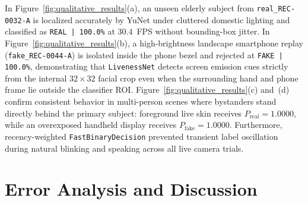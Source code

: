 In Figure~\ref{fig:qualitative_results}(a), an unseen elderly subject from \texttt{real\_REC-0032-A} is localized accurately by YuNet under cluttered domestic lighting and classified as \texttt{REAL | 100.0\%} at $30.4$~FPS without bounding-box jitter. In Figure~\ref{fig:qualitative_results}(b), a high-brightness landscape smartphone replay (\texttt{fake\_REC-0044-A}) is isolated inside the phone bezel and rejected at \texttt{FAKE | 100.0\%}, demonstrating that \texttt{LivenessNet} detects screen emission cues strictly from the internal $32\times32$ facial crop even when the surrounding hand and phone frame lie outside the classifier ROI. Figure~\ref{fig:qualitative_results}(c) and~(d) confirm consistent behavior in multi-person scenes where bystanders stand directly behind the primary subject: foreground live skin receives $P_{\text{real}} = 1.0000$, while an overexposed handheld display receives $P_{\text{fake}} = 1.0000$. Furthermore, recency-weighted \texttt{FastBinaryDecision} prevented transient label oscillation during natural blinking and speaking across all live camera trials.

\section{Error Analysis and Discussion}
\label{sec:error_analysis}

